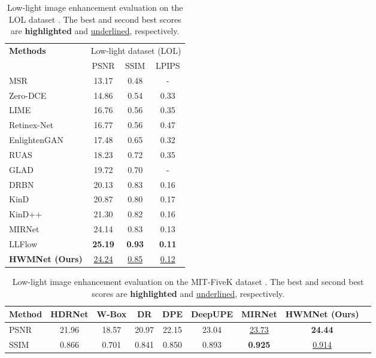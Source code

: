 \documentclass{article}
\begin{document}
\begin{table}[!b] \small
	\caption{Low-light image enhancement evaluation on the LOL dataset \cite{lol}. The best and second best scores are \textbf{highlighted} and \underline{underlined}, respectively.}
\vspace*{-4.5mm}  \label{LOL_table}
	\begin{center}
\setlength{\tabcolsep}{3.5mm}
	\begin{tabular}{l || ccc}
	\toprule[1.5 pt]
\multirow{2}{*}{\textbf{Methods}}&\multicolumn{3}{c}{Low-light dataset (LOL) \cite{lol}}\\
&PSNR &SSIM &LPIPS \\
	\midrule[1.5 pt]
MSR \cite{MSR}  					&13.17&0.48&-\\
Zero-DCE \cite{zeroDCE}			&14.86&0.54&0.33\\
LIME \cite{lime}           			&16.76&0.56&0.35\\
Retinex-Net \cite{retinexnet}		&16.77&0.56&0.47\\
EnlightenGAN \cite{enlightengan}  &17.48&0.65&0.32\\
RUAS \cite{RUAS}					&18.23&0.72&0.35\\
GLAD \cite{gladnet}  				&19.72&0.70&-\\
DRBN \cite{DRBN}					&20.13&0.83&0.16\\
KinD \cite{kind}  					&20.87&0.80&0.17\\
KinD++ \cite{kind++}  				&21.30&0.82&0.16\\
MIRNet \cite{01}					&24.14&0.83&0.13\\
LLFlow \cite{LLFlow}				&\textbf{25.19}&\textbf{0.93}&\textbf{0.11}\\
	\midrule[1.5 pt]
\textbf{HWMNet (Ours)}          	&\underline{24.24}&\underline{0.85}&\underline{0.12}\\
	\bottomrule[1.5pt]
	\end{tabular}
	\end{center}
\end{table}



\begin{table*}[!ht] \footnotesize
\caption{Low-light image enhancement evaluation on the MIT-FiveK dataset \cite{fivek}. The best and second best scores are \textbf{highlighted} and \underline{underlined}, respectively.}
\vspace*{-5mm}  \label{fiveK_table}
\begin{center}
\setlength{\tabcolsep}{4.2mm}
\begin{tabular}{l cccccccc}
\toprule[1.5 pt]
Method&HDRNet \cite{HDR}&W-Box \cite{wbox}&DR \cite{dr}&DPE \cite{DPE}&DeepUPE \cite{DeepUPE}&MIRNet \cite{01}&HWMNet (Ours)\\
\midrule[1.5 pt]
PSNR&21.96&18.57&20.97&22.15&23.04&\underline{23.73}&\textbf{24.44}\\
SSIM&0.866&0.701&0.841&0.850&0.893&\textbf{0.925}&\underline{0.914}\\
\bottomrule[1.5pt]
\end{tabular}
\end{center}
\end{table*}
\end{document}
